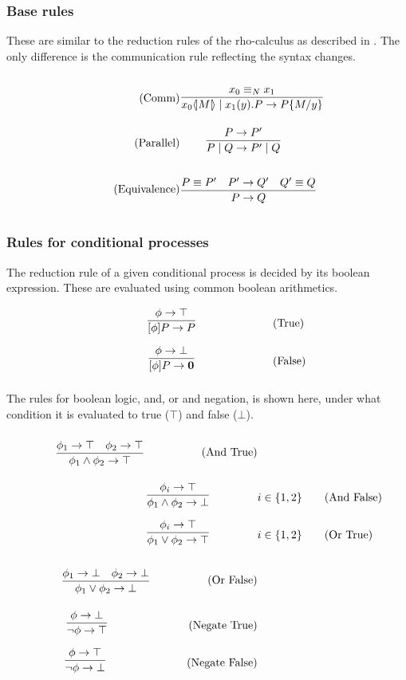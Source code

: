 \subsubsection{Base rules}
These are similar to the reduction rules of the rho-calculus as described in \citep{Meredith2005}. The only difference is the communication rule reflecting the syntax changes.

\begin{align}
    \tag{Comm} \infrule{x_0 \equiv_N x_1}{\lift{x_0}{M}\para\inp{x_1}{y}P\ra P\{M/y\}}&\\
        \tag{Parallel} \infrule{P\ra P'}{P\para Q\ra P'\para Q}&\\
        \tag{Equivalence} \infrule{P\equiv P'\quad P'\ra Q'\quad Q'\equiv Q}{P\ra Q}&
\end{align}

\FloatBarrier

\subsubsection{Rules for conditional processes}
The reduction rule of a given conditional process is decided by its boolean expression. These are evaluated using common boolean arithmetics.

\begin{align}
    & \infrule{\phi \ra \top}{[\phi]P\ra P} \tag{True}\\
        & \infrule{\phi \ra \bot}{[\phi]P\ra \nil} \tag{False}
\end{align}

The rules for boolean logic, and, or and negation, is shown here, under what condition it is evaluated to true (\ensuremath{\top}) and false (\ensuremath{\bot}).
\begin{align*}
    \infrule{\phi_1 \ra \top \quad \phi_2 \ra \top}{\phi_1 \wedge \phi_2 \ra \top}\tag{And True}\\
    \infrule{\phi_i \ra \top}{\phi_1 \wedge \phi_2 \ra \bot} &i\in \{1,2\}\tag{And False}\\
    \infrule{\phi_i \ra \top}{\phi_1 \vee \phi_2 \ra \top} &i\in \{1,2\} \tag{Or True}\\
    \infrule{\phi_1 \ra \bot \quad \phi_2 \ra \bot}{\phi_1 \vee \phi_2 \ra \bot} \tag{Or False}\\
    \infrule{\phi \ra \bot}{\neg\phi \ra \top} \tag{Negate True}\\
    \infrule{\phi \ra \top}{\neg\phi \ra \bot} \tag{Negate False}\\
\end{align*}

